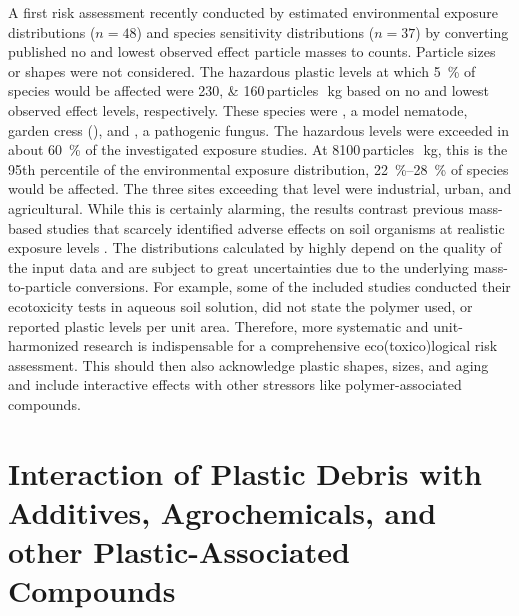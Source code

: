 A first risk assessment recently conducted by \citet{JacquesProbabilistic2021} estimated environmental exposure distributions ($n = 48$) and species sensitivity distributions ($n = 37$) by converting published no and lowest observed effect particle masses to counts. Particle sizes or shapes were not considered. The hazardous plastic levels at which \SI{5}{\percent} of species would be affected were \numlist{230;160}\,particles\,\si{\per\kilo\gram} based on no and lowest observed effect levels, respectively. These species were , a model nematode, garden cress (), and , a pathogenic fungus. The hazardous levels were exceeded in about \SI{60}{\percent} of the investigated exposure studies. At \num{8100}\,particles\,\si{\per\kilo\gram}, this is the \num{95}th percentile of the environmental exposure distribution, \SIrange{22}{28}{\percent} of species would be affected. The three sites exceeding that level were industrial, urban, and agricultural.
While this is certainly alarming, the results contrast previous mass-based studies that scarcely identified adverse effects on soil organisms at realistic exposure levels \citep{BuksWhat2020}. The distributions calculated by \citet{JacquesProbabilistic2021} highly depend on the quality of the input data and are subject to great uncertainties due to the underlying mass-to-particle conversions. For example, some of the included studies conducted their ecotoxicity tests in aqueous soil solution, did not state the polymer used, or reported plastic levels per unit area.
Therefore, more systematic and unit-harmonized research is indispensable for a comprehensive eco(toxico)logical risk assessment. This should then also acknowledge plastic shapes, sizes, and aging and include interactive effects with other stressors like polymer-associated compounds.

\section[Interaction of Plastic Debris with Plastic-Associated Compounds]{Interaction of Plastic Debris with Additives, Agrochemicals, and other Plastic-Associated Compounds}
\label{sec:general-discussion:pacs}

